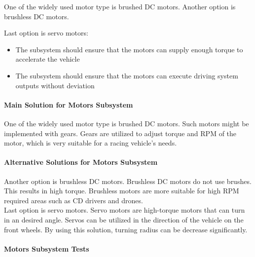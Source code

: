 \documentclass[a4paper,12pt]{article}
\begin{document}
	One of the widely used motor type is brushed DC motors. 
	Another option is brushless DC motors. 
	
	Last option is servo motors:
	\begin{itemize}
		\item The subsystem should ensure that the motors can supply enough torque to accelerate the vehicle		
		\item  The subsystem should ensure that the motors can execute driving system outputs without deviation 
	\end{itemize}
	
	\paragraph{Main Solution for Motors Subsystem}
	
	One of the widely used motor type is brushed DC motors. Such motors might be implemented with gears. Gears are utilized to adjust torque and RPM of the motor, which is very suitable for a racing vehicle's needs. \\
	
	\paragraph{Alternative Solutions for Motors Subsystem}
	
 	Another option is brushless DC motors. Brushless DC motors do not use brushes. This results in high torque. Brushless motors are more suitable for high RPM required areas such as CD drivers and drones.\\
	
	Last option is servo motors. Servo motors are high-torque motors that can turn in an desired angle. Servos can be utilized in the direction of the vehicle on the front wheels. By using this solution, turning radius can be decrease significantly.\\
	
	\paragraph{Motors Subsystem Tests}
	
\end{document}
